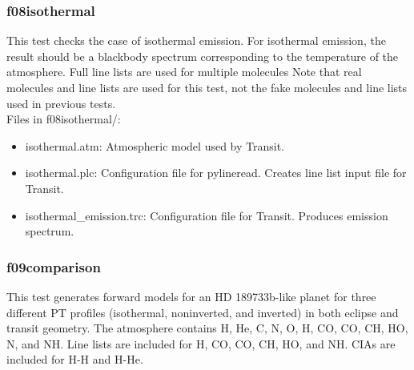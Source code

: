 \documentclass[letterpaper, 12pt]{article}
\begin{document}
\subsubsection{f08isothermal}
\label{sec:isothermal}
This test checks the case of isothermal emission. For isothermal emission, 
the result should be a blackbody spectrum corresponding to the temperature 
of the atmosphere. Full line lists are used for multiple molecules 
Note that real molecules and line lists are used for this test, not the 
fake molecules and line lists used in previous tests.\\

Files in f08isothermal/:
\begin{itemize} \itemsep0pt
  \item isothermal.atm: Atmospheric model used by Transit.
  \item isothermal.plc: Configuration file for pylineread. Creates 
        line list input file for Transit.
  \item isothermal{\_}emission.trc: Configuration file for Transit. Produces 
        emission spectrum.
\end{itemize}

\subsubsection{f09comparison}
\label{sec:comp}
This test generates forward models for an HD 189733b-like planet for three 
different PT profiles (isothermal, noninverted, and inverted) in both 
eclipse and transit geometry. The atmosphere contains H, He, C, N, O, H, 
CO, CO, CH, HO, N, and NH. Line lists are 
included for H, CO, CO, CH, HO, and NH. CIAs 
are included for H-H and H-He.\\
\end{document}
